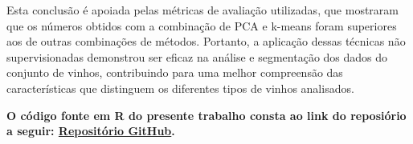 \documentclass[
  letterpaper,
  DIV=11,
  numbers=noendperiod]{scrartcl}
\begin{document}
Esta conclusão é apoiada pelas métricas de avaliação utilizadas, que
mostraram que os números obtidos com a combinação de PCA e k-means foram
superiores aos de outras combinações de métodos. Portanto, a aplicação
dessas técnicas não supervisionadas demonstrou ser eficaz na análise e
segmentação dos dados do conjunto de vinhos, contribuindo para uma
melhor compreensão das características que distinguem os diferentes
tipos de vinhos analisados.

\textbf{O código fonte em R do presente trabalho consta ao link do
reposiório a seguir:
\href{https://github.com/mello-pedro/SUPERV_ML_MCDE_23_24/blob/main/R_SOURCE_CODE_BIKE_SHARING.qmd}{Repositório
GitHub}.}
\end{document}
